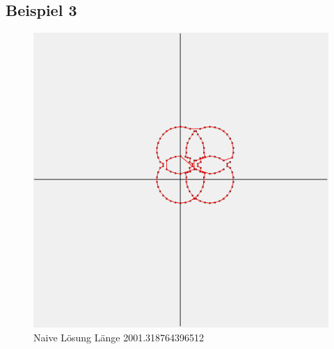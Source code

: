 \subsection{Beispiel 3}\label{subsec:beispiel-3}
\begin{figure}[h]
    \centering
    \begin{minipage}[b]{0.6\textwidth}
        \includegraphics[width=\textwidth]{naivwenigerkrumm3}
        \caption{Naive Lösung Länge 2001.318764396512}
    \end{minipage}\label{fig:wenigerkrumm3}
\end{figure}
\FloatBarrier

